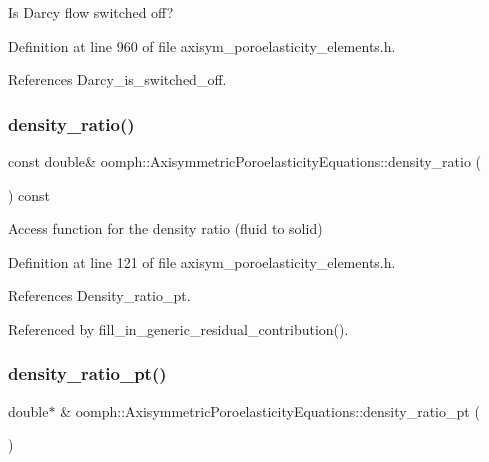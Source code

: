 Is Darcy flow switched off? 



Definition at line 960 of file axisym\+\_\+poroelasticity\+\_\+elements.\+h.



References Darcy\+\_\+is\+\_\+switched\+\_\+off.

\mbox{\label{classoomph_1_1AxisymmetricPoroelasticityEquations_a96584beacdd7c3b3b248f2ea8e016731}} 
\subsubsection{\texorpdfstring{density\+\_\+ratio()}{density\_ratio()}}
{\footnotesize\ttfamily const double\& oomph\+::\+Axisymmetric\+Poroelasticity\+Equations\+::density\+\_\+ratio (\begin{DoxyParamCaption}{ }\end{DoxyParamCaption}) const\hspace{0.3cm}{\ttfamily [inline]}}



Access function for the density ratio (fluid to solid) 



Definition at line 121 of file axisym\+\_\+poroelasticity\+\_\+elements.\+h.



References Density\+\_\+ratio\+\_\+pt.



Referenced by fill\+\_\+in\+\_\+generic\+\_\+residual\+\_\+contribution().

\mbox{\label{classoomph_1_1AxisymmetricPoroelasticityEquations_a54c0959b5f478e7d48725ab516d950bb}} 
\subsubsection{\texorpdfstring{density\+\_\+ratio\+\_\+pt()}{density\_ratio\_pt()}}
{\footnotesize\ttfamily double$\ast$ \& oomph\+::\+Axisymmetric\+Poroelasticity\+Equations\+::density\+\_\+ratio\+\_\+pt (\begin{DoxyParamCaption}{ }\end{DoxyParamCaption})\hspace{0.3cm}{\ttfamily [inline]}}



